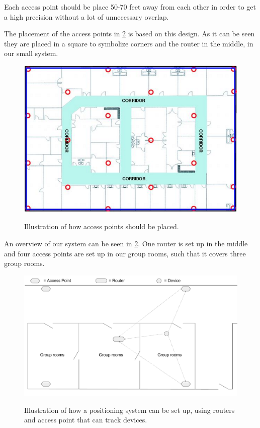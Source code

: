 Each access point should be place 50-70 feet away from each other in order to get a high precision without a lot of unnecessary overlap\cite{access_point_range}.
 
The placement of the access points in \cref{fig:OwnSetup} is based on this design. As it can be seen they are placed in a square to symbolize corners and the router in the middle, in our small system.

\begin{figure}[H]
	\centering
	\includegraphics[scale=0.5]{graphics/access_placement.png}
	\label{fig:access_placement}
	\caption{Illustration of how access points should be placed.}
\end{figure}

An overview of our system can be seen in \cref{fig:OwnSetup}. One router is set up in the middle and four access points are set up in our group rooms, such that it covers three group rooms.
\begin{figure}[H]
	\centering
	\includegraphics[scale=0.5]{graphics/Router-AccessPoint_Setup.pdf}
	\label{fig:OwnSetup}
	\caption{Illustration of how a positioning system can be set up, using routers and access point that can track devices.}
\end{figure}

